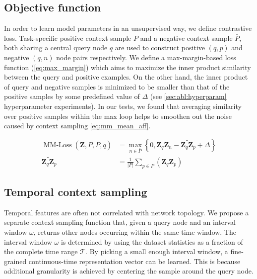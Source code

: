 \subsection{Objective function} \label{sec:obj_fn}
In order to learn model parameters in an unsupervised way, we define contrastive loss.
Task-specific positive context sample $P$ and a negative context sample $\bar{P}$, both sharing a central query node $q$ are used to construct positive $(q, p)$ and negative $(q, n)$ node pairs respectively.
We define a max-margin-based loss function (\cref{eq:max_margin}) which aims to maximize the inner product similarity between the query and positive examples.
On the other hand, the inner product of query and negative samples is minimized to be smaller than that of the positive samples by some predefined value of $\Delta$ (see \cref{sec:abl:hyperparam} hyperparameter experiments).
In our tests, we found that averaging similarity over positive samples within the max loop helps to smoothen out the noise caused by context sampling \cref{eq:mm_mean_aff}.

\begin{align}
    \operatorname{MM-Loss}(\mathbf{Z}, P, \bar{P}, q) &= \max_{n \in \bar{P}} \left\{0, \mathbf{Z}_q \mathbf{Z}_n - \widetilde{\mathbf{Z}_q \mathbf{Z}_p} + \Delta \right\} \label{eq:max_margin} \\
    \widetilde{\mathbf{Z}_q \mathbf{Z}_p} &= \frac{1}{|P|} \sum_{p \in P } \left(\mathbf{Z}_q \mathbf{Z}_p \right) \label{eq:mm_mean_aff}
\end{align}

\subsection{Temporal context sampling}\label{sec:tempo_sampling}


Temporal features are often not correlated with network topology.
We propose a separate context sampling function that, given a query node and an interval window $\omega$, returns other nodes occurring within the same time window. 
The interval window $\omega$ is determined by using the dataset statistics as a fraction of the complete time range $\mathcal{T}$.
By picking a small enough interval window, a fine-grained continuous-time representation vector can be learned.
This is because additional granularity is achieved by centering the sample around the query node.


